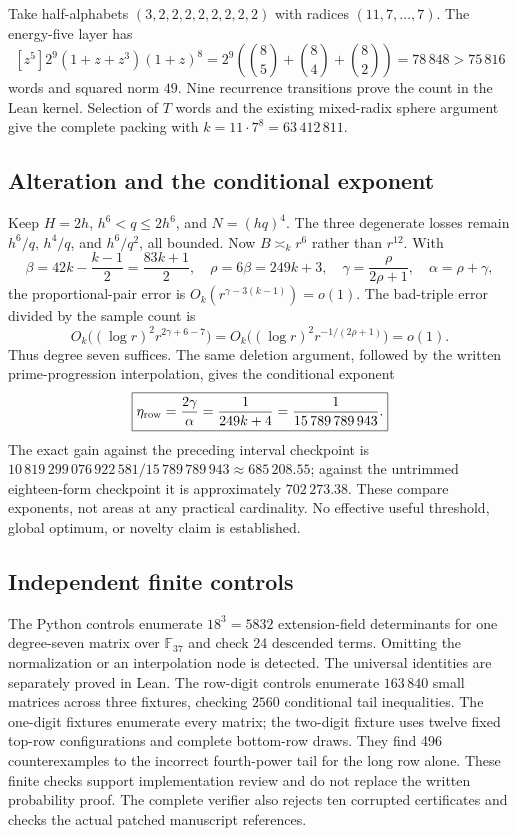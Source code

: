 \documentclass[11pt]{article}
\begin{document}
Take half-alphabets $(3,2,2,2,2,2,2,2,2)$ with radices $(11,7,\ldots,7)$.
The energy-five layer has
\[
 [z^5]2^9(1+z+z^3)(1+z)^8
 =2^9\left(\binom85+\binom84+\binom82\right)
 =78\,848>75\,816
\]
words and squared norm $49$. Nine recurrence transitions prove the
count in the Lean kernel. Selection of $T$ words and the existing
mixed-radix sphere argument give the complete packing with
$k=11\cdot7^8=63\,412\,811$.

\subsection{Alteration and the conditional exponent}
Keep $H=2h$, $h^6<q\le2h^6$, and $N=(hq)^4$. The three degenerate
losses remain $h^6/q$, $h^4/q$, and $h^6/q^2$, all bounded.
Now $B\asymp_k r^6$ rather than $r^{12}$. With
\[
 \beta=42k-\frac{k-1}{2}=\frac{83k+1}{2},\quad
 \rho=6\beta=249k+3,\quad
 \gamma=\frac{\rho}{2\rho+1},\quad \alpha=\rho+\gamma,
\]
the proportional-pair error is $O_k(r^{\gamma-3(k-1)})=o(1)$.
The bad-triple error divided by the sample count is
\[
 O_k\bigl((\log r)^2r^{2\gamma+6-7}\bigr)
 =O_k\bigl((\log r)^2r^{-1/(2\rho+1)}\bigr)=o(1).
\]
Thus degree seven suffices. The same deletion argument, followed by
the written prime-progression interpolation, gives the conditional exponent
\[
 \boxed{\eta_{\rm row}=\frac{2\gamma}{\alpha}
       =\frac1{249k+4}=\frac1{15\,789\,789\,943}.}
\]
The exact gain against the preceding interval checkpoint is
$10\,819\,299\,076\,922\,581/15\,789\,789\,943\approx685\,208.55$;
against the untrimmed eighteen-form checkpoint it is approximately
$702\,273.38$. These compare exponents, not areas at any practical
cardinality. No effective useful threshold, global optimum, or novelty
claim is established.

\subsection{Independent finite controls}
The Python controls enumerate $18^3=5832$ extension-field determinants
for one degree-seven matrix over $\mathbb F_{37}$ and check 24 descended
terms. Omitting the normalization or an interpolation node is detected.
The universal identities are separately proved in Lean.
The row-digit controls enumerate $163\,840$ small matrices across three
fixtures, checking $2560$ conditional tail inequalities. The one-digit
fixtures enumerate every matrix; the two-digit fixture uses twelve fixed
top-row configurations and complete bottom-row draws. They find 496
counterexamples to the incorrect fourth-power tail for the long row alone.
These finite checks support implementation review and do not replace
the written probability proof. The complete verifier also rejects ten
corrupted certificates and checks the actual patched manuscript references.
\end{document}
